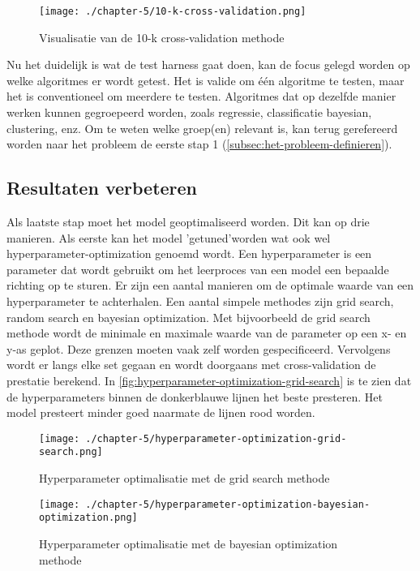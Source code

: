 \begin{figure}[hbt!]
  \centering
  \texttt{[image: ./chapter-5/10-k-cross-validation.png]}
  \caption{Visualisatie van de 10-k cross-validation methode}
  \label{fig:10-k-cross-validation}
\end{figure}

Nu het duidelijk is wat de test harness gaat doen, kan de focus gelegd worden op welke algoritmes er wordt getest. Het is valide om één algoritme te testen, maar het is conventioneel om meerdere te testen. Algoritmes dat op dezelfde manier werken kunnen gegroepeerd worden, zoals regressie, classificatie bayesian, clustering, enz. Om te weten welke groep(en) relevant is, kan terug gerefereerd worden naar het probleem de eerste stap 1 (\autoref{subsec:het-probleem-definieren}).

\subsection{Resultaten verbeteren}\label{subsec:resultaten verbeteren}
Als laatste stap moet het model geoptimaliseerd worden. Dit kan op drie manieren. Als eerste kan het model 'getuned'\space worden wat ook wel \gls{hyperparameter-optimization} genoemd wordt. Een hyperparameter is een parameter dat wordt gebruikt om het leerproces van een model een bepaalde richting op te sturen. Er zijn een aantal manieren om de optimale waarde van een hyperparameter te achterhalen. Een aantal simpele methodes zijn grid search, random search en bayesian optimization. Met bijvoorbeeld de grid search methode wordt de minimale en maximale waarde van de parameter op een x- en y-as geplot. Deze grenzen moeten vaak zelf worden gespecificeerd. Vervolgens wordt er langs elke set gegaan en wordt doorgaans met \gls{cross-validation} de prestatie berekend. In \autoref{fig:hyperparameter-optimization-grid-search} is te zien dat de hyperparameters binnen de donkerblauwe lijnen het beste presteren. Het model presteert minder goed naarmate de lijnen rood worden.

\begin{figure}[hbt!]
  \centering
  \begin{minipage}{0.47\textwidth}
      \centering
      \texttt{[image: ./chapter-5/hyperparameter-optimization-grid-search.png]}
      \caption{Hyperparameter optimalisatie met de grid search methode}
      \label{fig:hyperparameter-optimization-grid-search}
  \end{minipage}\hfill
  \begin{minipage}{0.47\textwidth}
      \centering
      \texttt{[image: ./chapter-5/hyperparameter-optimization-bayesian-optimization.png]}
      \caption{Hyperparameter optimalisatie met de bayesian optimization methode}
      \label{fig:hyperparameter-optimization-bayesian-optimization}
  \end{minipage}
\end{figure}

